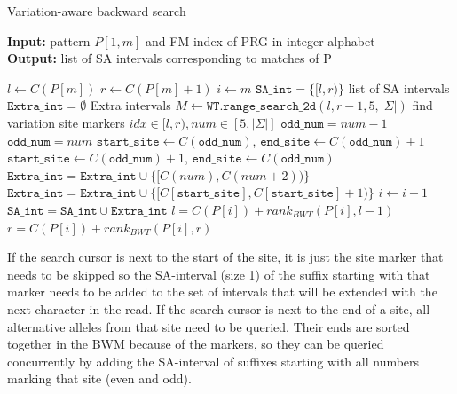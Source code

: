 \documentclass[runningheads,a4paper]{llncs}
\begin{document}
\begin{algorithm}[H]
\caption{Variation-aware backward search} \label{bsearch}
\textbf{Input:} \textrm{pattern} $P[1,m]$ \textrm{and FM-index of PRG in integer alphabet}\\
\textbf{Output:} \textrm{list of SA intervals corresponding to matches of P} 
\begin{algorithmic}[1]
\State $l \gets C(P[m])$
\State $r \gets C(P[m]+1)$
\State $i \gets m$
\State $\texttt{SA\char`_int}=\{[l,r)\}$ \Comment list of SA intervals
\State $\texttt{Extra\char`_int}=\emptyset$   \Comment Extra intervals
\ForAll {$[l,r) \in \texttt{SA\char`_int}$} 
\State $M \gets \texttt{WT.range\char`_search\char`_2d} (l,r-1,5,|\Sigma|)$ \Comment find variation site markers
  \Comment $ idx\in [l,r), num\in[5,|\Sigma|]$
\State $\texttt{odd\char`_num}=num-1$
\Else
\State $\texttt{odd\char`_num}=num$
\EndIf
{}
\State $\texttt{start\char`_site} \gets C(\texttt{odd\char`_num})$, $\texttt{end\char`_site} \gets C(\texttt{odd\char`_num})+1$
\Else 
\State $\texttt{start\char`_site} \gets C(\texttt{odd\char`_num})+1$, $\texttt{end\char`_site} \gets C(\texttt{odd\char`_num})$
\EndIf
{}
\State $\texttt{Extra\char`_int}=\texttt{Extra\char`_int} \cup \{[C(num),C(num+2))\}$
\Else
\State $\texttt{Extra\char`_int}=\texttt{Extra\char`_int} \cup \{[C[\texttt{start\char`_site}], C[\texttt{start\char`_site}]+1)\}$
\EndIf
\EndFor
\EndFor
\State $i \gets i-1$
\State $\texttt{SA\char`_int}=\texttt{SA\char`_int} \cup \texttt{Extra\char`_int}$
\ForAll {$[l,r) \in \texttt{SA\char`_int}$} 
\State $l=C(P[i])+rank_{BWT}(P[i],l-1)$
\State $r=C(P[i])+rank_{BWT}(P[i],r)$
\EndFor
\EndWhile
\end {algorithmic}
\end{algorithm}


If the search cursor is next to the start of the site, it is just the site marker that needs to be skipped so the SA-interval (size 1) of the suffix starting with that marker needs to be added to the set of intervals that will be extended with the next character in the read. If the search cursor is next to the end of a site, all alternative alleles from that site need to be queried. Their ends are sorted together in the BWM because of the markers, so they can be queried concurrently by adding the SA-interval of suffixes starting with all numbers marking that site (even and odd). 
\end{document}
